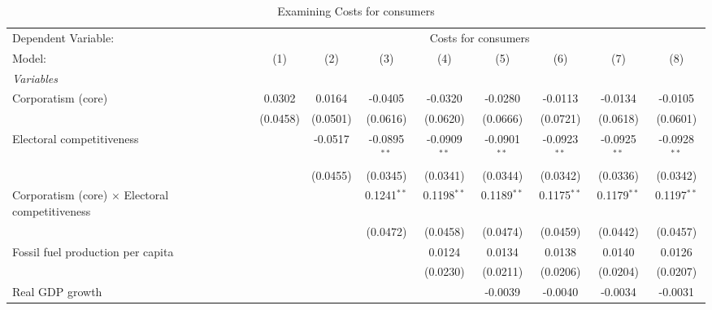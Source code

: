 
\begin{table}[htbp]
   \caption{Examining Costs for consumers}
   \centering
   \begin{tabular}{lcccccccc}
      \tabularnewline \midrule \midrule
      Dependent Variable: & \multicolumn{8}{c}{Costs for consumers}\\
      Model:                                                 & (1)      & (2)      & (3)            & (4)            & (5)            & (6)            & (7)            & (8)\\  
      \midrule
      \emph{Variables}\\
      Corporatism (core)                                     & 0.0302   & 0.0164   & -0.0405        & -0.0320        & -0.0280        & -0.0113        & -0.0134        & -0.0105\\   
                                                             & (0.0458) & (0.0501) & (0.0616)       & (0.0620)       & (0.0666)       & (0.0721)       & (0.0618)       & (0.0601)\\   
      Electoral competitiveness                              &          & -0.0517  & -0.0895$^{**}$ & -0.0909$^{**}$ & -0.0901$^{**}$ & -0.0923$^{**}$ & -0.0925$^{**}$ & -0.0928$^{**}$\\   
                                                             &          & (0.0455) & (0.0345)       & (0.0341)       & (0.0344)       & (0.0342)       & (0.0336)       & (0.0342)\\   
      Corporatism (core) $\times$ Electoral competitiveness  &          &          & 0.1241$^{**}$  & 0.1198$^{**}$  & 0.1189$^{**}$  & 0.1175$^{**}$  & 0.1179$^{**}$  & 0.1197$^{**}$\\   
                                                             &          &          & (0.0472)       & (0.0458)       & (0.0474)       & (0.0459)       & (0.0442)       & (0.0457)\\   
      Fossil fuel production per capita                      &          &          &                & 0.0124         & 0.0134         & 0.0138         & 0.0140         & 0.0126\\   
                                                             &          &          &                & (0.0230)       & (0.0211)       & (0.0206)       & (0.0204)       & (0.0207)\\   
      Real GDP growth                                        &          &          &                &                & -0.0039        & -0.0040        & -0.0034        & -0.0031\\   

\end{tabular}
\end{table}
